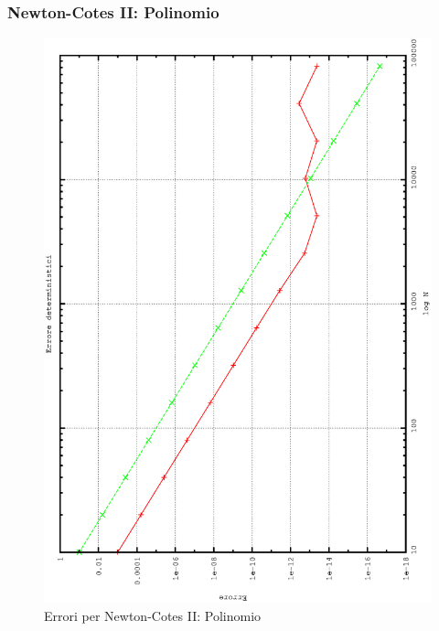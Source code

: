 \subsubsection{Newton-Cotes II: Polinomio}
\begin{figure}[h]
\includegraphics[width=0.7\columnwidth,angle=-90]{plot_simp_poly.eps}
\caption{Errori per Newton-Cotes II: Polinomio}
\end{figure}

